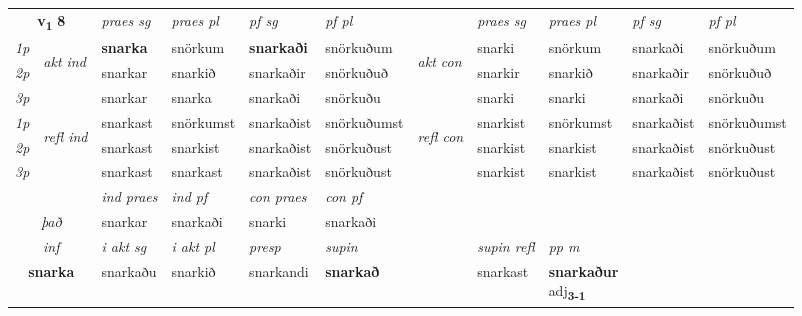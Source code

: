 \noindent
\begin{tabular}{lllllllllll} \toprule
\multicolumn{2}{c}{\textbf{v{\textsubscript{1}}} \Large{\textbf{8}}}  &  \textit{praes sg}  & \textit{praes pl}  &\textit{ pf sg} & \textit{pf pl} &  &  \textit{praes sg}  & \textit{praes pl}  & \textit{pf sg} & \textit{pf pl } \\*
	\cmidrule{3-6} \cmidrule{8-11}
 {\textit{1p}} & \multirow{3}{*}{\begin{turn}{90}\textit{akt ind}\end{turn}} & \textbf{snarka} & snörkum & \textbf{snarkaði} & snörkuðum & \multirow{3}{*}{\begin{turn}{90}\textit{akt con}\end{turn}} &snarki & snörkum & snarkaði & snörkuðum\\*
 {\textit{2p}} &  &  snarkar  & snarkið & snarkaðir & snörkuðuð & & snarkir & snarkið & snarkaðir & snörkuðuð \\*
{\textit{3p}} &  & snarkar & snarka & snarkaði & snörkuðu & & snarki & snarki& snarkaði & snörkuðu \\*
\cmidrule{3-6} \cmidrule{8-11}
 {\textit{1p}} & \multirow{3}{*}{\begin{turn}{90}\textit{refl ind}\end{turn}}  & snarkast & snörkumst & snarkaðist & snörkuðumst & \multirow{3}{*}{\begin{turn}{90}\textit{refl con}\end{turn}}  &snarkist & snörkumst & snarkaðist & snörkuðumst \\*
 {\textit{2p}} &  & snarkast & snarkist & snarkaðist & snörkuðust & &snarkist & snarkist & snarkaðist & snörkuðust \\*
 {\textit{3p}}  & & snarkast & snarkast & snarkaðist & snörkuðust & & snarkist & snarkist& snarkaðist & snörkuðust \\*
\cmidrule{3-6} \cmidrule{8-11}

   & &  \textit{ind praes} & \textit{ind pf} & \textit{con praes} & \textit{con pf} \\*
\multicolumn{2}{c}{ \textit{það} } & snarkar & snarkaði & snarki & snarkaði \\*

\cmidrule{3-9}
   \multicolumn{2}{c}{\textit{inf}}  & \textit{i akt sg} & \textit{i akt pl}   & \textit{presp} & \textit{supin} && \textit{supin refl} & \textit{pp m} \\*
  \multicolumn{2}{c}{\textbf{snarka}} & snarkaðu  & snarkið   & snarkandi &  \textbf{snarkað} && snarkast & \specialcell{\textbf{snarkaður} \\ adj\textbf{\textsubscript{3-1}}} \\*
\end{tabular}

